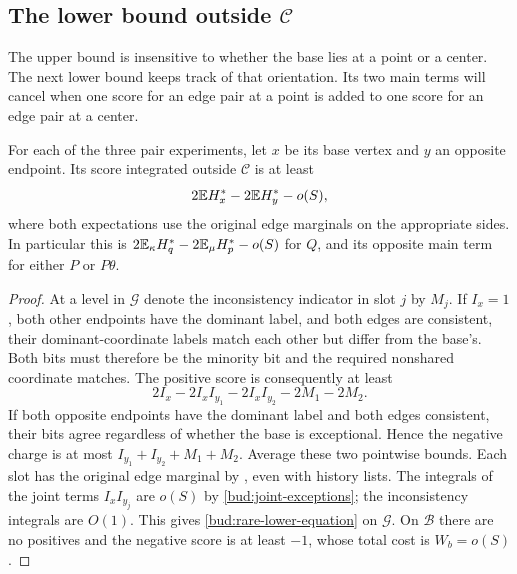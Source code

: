 \subsection{\texorpdfstring{The lower bound outside $\mathcal C$}{The lower bound outside C}}

The upper bound is insensitive to whether the base lies at a
point or a center.  The next lower bound keeps track of that
orientation.  Its two main terms will cancel when one score for an edge pair at a point is added to one score for an edge pair at a center.

\begin{proposition}\label{bud:rare-lower}
For each of the three pair experiments, let $x$ be its base vertex
and $y$ an opposite endpoint.  Its score integrated outside
$\mathcal C$ is at least
\begin{equation}\label{bud:rare-lower-equation}
 2\mathbb E H_x^*-2\mathbb E H_y^*-o(S),
\end{equation}
where both expectations use the original edge marginals on the
appropriate sides.  In particular this is
$2\mathbb E_\kappa H_q^*-2\mathbb E_\mu H_p^*-o(S)$ for $Q$, and its opposite
main term for either $P$ or $P\theta$.
\end{proposition}

\begin{proof}
At a level in $\mathcal G$ denote the inconsistency indicator in slot
$j$ by $M_j$.  If $I_x=1$, both other endpoints have the dominant label, and
both edges are consistent, their dominant-coordinate labels
match each other but differ from the base's.  Both bits must
therefore be the minority bit and the required nonshared
coordinate matches.  The positive score is consequently at least
\[
 2I_x-2I_x I_{y_1}-2I_x I_{y_2}-2M_1-2M_2.
\]
If both opposite endpoints have the dominant label and both edges consistent,
their bits agree regardless of whether the base is exceptional.
Hence the negative charge is at most
$I_{y_1}+I_{y_2}+M_1+M_2$.
Average these two pointwise bounds.  Each slot has the original
edge marginal by , even with history lists.
The integrals of the joint terms $I_xI_{y_j}$ are $o(S)$ by
\eqref{bud:joint-exceptions}; the inconsistency integrals are
$O(1)$.  This gives \eqref{bud:rare-lower-equation} on
$\mathcal G$.  On $\mathcal B$ there are no positives and the
negative score is at least $-1$, whose total cost is
$W_b=o(S)$.
\end{proof}
